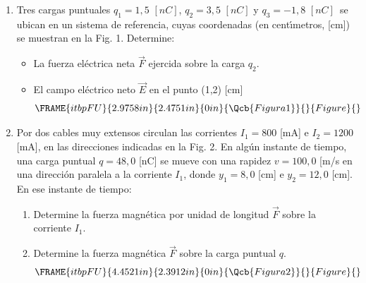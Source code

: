 \documentclass{article}
\begin{document}
\begin{enumerate}
\item Tres cargas puntuales $q_{1}=1,5$ $[nC]$, $q_{2}=3,5$ $[nC]$ y $%
q_{3}=-1,8$ $[nC]$\ se ubican en un sistema de referencia, cuyas coordenadas
(en cent\'{\i}metros, [cm]) se muestran en la Fig. 1. Determine:

\begin{itemize}
\item La fuerza el\'{e}ctrica neta $\vec{F}$ ejercida sobre la carga $q_{2}.$

\item El campo el\'{e}ctrico neto $\vec{E}$ en el punto (1,2) [cm]%
\begin{equation*}
\FRAME{itbpFU}{2.9758in}{2.4751in}{0in}{\Qcb{Figura 1}}{}{Figure}{\special%
{language "Scientific Word";type "GRAPHIC";maintain-aspect-ratio
TRUE;display "USEDEF";valid_file "T";width 2.9758in;height 2.4751in;depth
0in;original-width 7.0206in;original-height 5.8332in;cropleft "0";croptop
"1";cropright "1";cropbottom "0";tempfilename
'TI86TE02.wmf';tempfile-properties "XPR";}}
\end{equation*}%
\pagebreak 
\end{itemize}

\item Por dos cables muy extensos circulan las corrientes $I_{1}=800$ [mA] e 
$I_{2}=1200$ [mA], en las direcciones indicadas en la Fig. 2. En alg\'{u}n
instante de tiempo, una carga puntual $q=48,0$ [nC] se mueve con una rapidez 
$v=100,0$ [m/s\NEG{]} en una direcci\'{o}n paralela a la corriente $I_{1}$,
donde $y_{1}=8,0$ [cm] e $y_{2}=12,0$ [cm]. En ese instante de tiempo:

\begin{enumerate}
\item Determine la fuerza magn\'{e}tica por unidad de longitud $\vec{F}$
sobre la corriente $I_{1}.$

\item Determine la fuerza magn\'{e}tica $\vec{F}$ sobre la carga puntual $q.$
\begin{equation*}
\FRAME{itbpFU}{4.4521in}{2.3912in}{0in}{\Qcb{Figura 2}}{}{Figure}{\special%
{language "Scientific Word";type "GRAPHIC";maintain-aspect-ratio
TRUE;display "USEDEF";valid_file "T";width 4.4521in;height 2.3912in;depth
0in;original-width 6.8666in;original-height 3.6754in;cropleft "0";croptop
"1";cropright "1";cropbottom "0";tempfilename
'TI86TE01.wmf';tempfile-properties "XPR";}}
\end{equation*}


\end{enumerate}
\end{enumerate}
\end{document}
